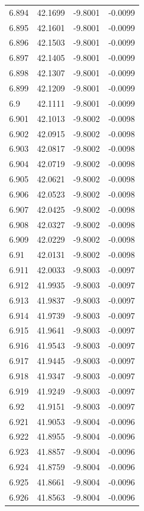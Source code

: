 \begin{tabular}{llll}
6.894 & 42.1699 & -9.8001 & -0.0099 \\
6.895 & 42.1601 & -9.8001 & -0.0099 \\
6.896 & 42.1503 & -9.8001 & -0.0099 \\
6.897 & 42.1405 & -9.8001 & -0.0099 \\
6.898 & 42.1307 & -9.8001 & -0.0099 \\
6.899 & 42.1209 & -9.8001 & -0.0099 \\
6.9 & 42.1111 & -9.8001 & -0.0099 \\
6.901 & 42.1013 & -9.8002 & -0.0098 \\
6.902 & 42.0915 & -9.8002 & -0.0098 \\
6.903 & 42.0817 & -9.8002 & -0.0098 \\
6.904 & 42.0719 & -9.8002 & -0.0098 \\
6.905 & 42.0621 & -9.8002 & -0.0098 \\
6.906 & 42.0523 & -9.8002 & -0.0098 \\
6.907 & 42.0425 & -9.8002 & -0.0098 \\
6.908 & 42.0327 & -9.8002 & -0.0098 \\
6.909 & 42.0229 & -9.8002 & -0.0098 \\
6.91 & 42.0131 & -9.8002 & -0.0098 \\
6.911 & 42.0033 & -9.8003 & -0.0097 \\
6.912 & 41.9935 & -9.8003 & -0.0097 \\
6.913 & 41.9837 & -9.8003 & -0.0097 \\
6.914 & 41.9739 & -9.8003 & -0.0097 \\
6.915 & 41.9641 & -9.8003 & -0.0097 \\
6.916 & 41.9543 & -9.8003 & -0.0097 \\
6.917 & 41.9445 & -9.8003 & -0.0097 \\
6.918 & 41.9347 & -9.8003 & -0.0097 \\
6.919 & 41.9249 & -9.8003 & -0.0097 \\
6.92 & 41.9151 & -9.8003 & -0.0097 \\
6.921 & 41.9053 & -9.8004 & -0.0096 \\
6.922 & 41.8955 & -9.8004 & -0.0096 \\
6.923 & 41.8857 & -9.8004 & -0.0096 \\
6.924 & 41.8759 & -9.8004 & -0.0096 \\
6.925 & 41.8661 & -9.8004 & -0.0096 \\
6.926 & 41.8563 & -9.8004 & -0.0096 \\

\end{tabular}
